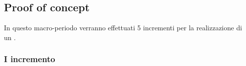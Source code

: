 \documentclass[../piano-di-progetto.tex]{subfiles}
\begin{document}
\subsection{Proof of concept}
In questo macro-periodo verranno effettuati 5 incrementi per la realizzazione di un .

\subsubsection{I incremento}
\end{document}
